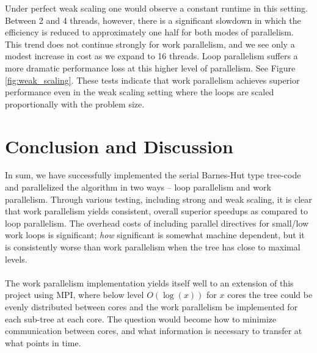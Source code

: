 \documentclass{article}
\begin{document}
Under perfect weak scaling one would observe a constant runtime in this setting. Between 2 and 4 threads, however, there is a significant slowdown in which the efficiency is reduced to approximately one half for both modes of parallelism. This trend does not continue strongly for work parallelism, and we see only a modest increase in cost as we expand to 16 threads. Loop parallelism suffers a more dramatic performance loss at this higher level of parallelism. See Figure \ref{fig:weak_scaling}. These tests indicate that work parallelism achieves superior performance even in the weak scaling setting where the loops are scaled proportionally with the problem size.

\section{Conclusion and Discussion}
In sum, we have successfully implemented the serial Barnes-Hut type tree-code and parallelized the algorithm in two ways -- loop parallelism and work parallelism. Through various testing, including strong and weak scaling, it is clear that work parallelism yields consistent, overall superior speedups as compared to loop parallelism. The overhead costs of including parallel directives for small/low work loops is significant; \emph{how} significant is somewhat machine dependent, but it is consistently worse than work parallelism when the tree has close to maximal levels.\\\\
The work parallelism implementation yields itself well to an extension of this project using MPI, where below level $O(\log(x))$ for $x$ cores the tree could be evenly distributed between cores and the work parallelism be implemented for each sub-tree at each core. The question would become how to minimize communication between cores, and what information is necessary to transfer at what points in time. 



\end{document}
